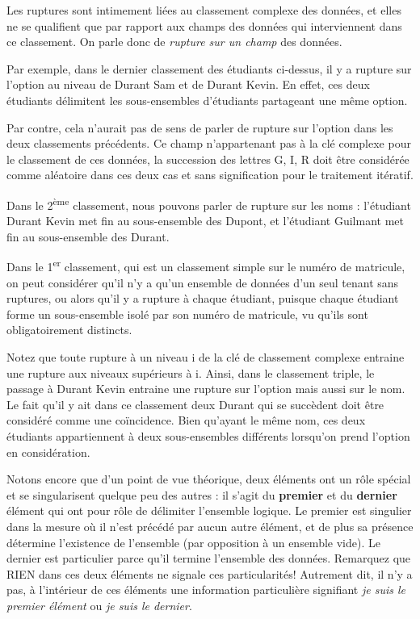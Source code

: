 Les ruptures sont intimement liées au classement complexe des données,
et elles ne se qualifient que par rapport aux champs des données qui
interviennent dans ce classement. On parle donc de \textit{rupture sur
un champ} des données.

Par exemple, dans le dernier classement des étudiants ci-dessus, il y a
rupture sur l’option au niveau de Durant Sam et de Durant Kevin. En
effet, ces deux étudiants délimitent les sous-ensembles d’étudiants
partageant une même option.

Par contre, cela n’aurait pas de sens de parler de rupture sur l’option
dans les deux classements précédents. Ce champ n’appartenant pas à la
clé complexe pour le classement de ces données, la succession des
lettres G, I, R doit être considérée comme aléatoire dans ces deux cas
et sans signification pour le traitement itératif.

Dans le 2\textsuperscript{ème} classement, nous pouvons parler de
rupture sur les noms : l’étudiant Durant Kevin met fin au sous-ensemble
des Dupont, et l’étudiant Guilmant met fin au sous-ensemble des Durant.


Dans le 1\textsuperscript{er} classement, qui est un classement simple
sur le numéro de matricule, on peut considérer qu’il n’y a qu’un
ensemble de données d’un seul tenant sans ruptures, ou alors qu’il y a
rupture à chaque étudiant, puisque chaque étudiant forme un
sous-ensemble isolé par son numéro de matricule, vu qu’ils sont
obligatoirement distincts.

Notez que toute rupture à un niveau i de la clé de classement complexe
entraine une rupture aux niveaux supérieurs à i. Ainsi, dans le
classement triple, le passage à Durant Kevin entraine une rupture sur
l’option mais aussi sur le nom. Le fait qu’il y ait dans ce classement
deux Durant qui se succèdent doit être considéré comme une coïncidence.
Bien qu’ayant le même nom, ces deux étudiants appartiennent à deux
sous-ensembles différents lorsqu’on prend l’option en considération.

Notons encore que d’un point de vue théorique, deux éléments ont un rôle
spécial et se singularisent quelque peu des autres : il s’agit du
\textbf{premier} et du \textbf{dernier} élément qui ont pour rôle de
délimiter l’ensemble logique. Le premier est singulier dans la mesure
où il n’est précédé par aucun autre élément, et de plus sa présence
détermine l’existence de l’ensemble (par opposition à un ensemble
vide). Le dernier est particulier parce qu’il termine l’ensemble des
données. Remarquez que RIEN dans ces deux éléments ne signale ces
particularités! Autrement dit, il n’y a pas, à l’intérieur de ces
éléments une information particulière signifiant \textit{je suis le
premier élément} ou \textit{je suis le dernier}.


